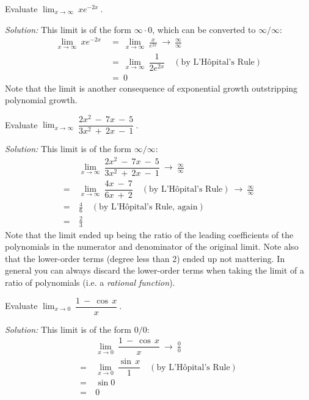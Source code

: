 \begin{exmp}\label{exmp:limzeroinf}
\noindent Evaluate $\displaystyle\lim_{x \to \infty}~x e^{-2x}~$.\vspace{1mm}
\par\noindent\emph{Solution:} This limit is of the form $\infty \cdot 0$, which
can be converted to $\infty/\infty$:
\begin{align*}
\lim_{x \to \infty}~x e^{-2x} ~&=~ \lim_{x \to \infty}~\frac{x}{e^{2x}} ~\to~ \frac{\infty}{\infty}\\
&=~ \lim_{x \to \infty}~\dfrac{1}{2e^{2x}} \quad(\text{by L'H\^{o}pital's Rule})\\
&=~ 0
\end{align*}
Note that the limit is another consequence of exponential growth outstripping
polynomial growth.
\end{exmp}
\begin{exmp}\label{exmp:limratpoly}
\noindent Evaluate $\displaystyle\lim_{x \to \infty}~\dfrac{2x^2 ~-~ 7x ~-~ 5}{3x^2 ~+~ 2x ~-~ 1}~$.\vspace{1mm}
\par\noindent\emph{Solution:} This limit is of the form $\infty/\infty$:
\begin{align*}
&\lim_{x \to \infty}~\dfrac{2x^2 ~-~ 7x ~-~ 5}{3x^2 ~+~ 2x ~-~ 1} ~\to~ \frac{\infty}{\infty}\\[4pt]
=~ &\lim_{x \to \infty}~\dfrac{4x ~-~ 7}{6x ~+~ 2} \quad(\text{by L'H\^{o}pital's Rule})
~\to~ \frac{\infty}{\infty} \\[6pt]
=~ &\frac{4}{6} \quad(\text{by L'H\^{o}pital's Rule, again})\\
=~ &\frac{2}{3}
\end{align*}
Note that the limit ended up being the ratio of the leading coefficients of the
polynomials in the numerator and denominator of the original limit. Note also
that the lower-order terms (degree less than 2) ended up not mattering. In
general you can always discard the lower-order terms when taking the limit of a
ratio of polynomials (i.e. a
\emph{rational function}).
\end{exmp}
\divider
\newpage
\begin{exmp}\label{exmp:lim1minuscos}
\noindent Evaluate $\displaystyle\lim_{x \to 0}~\dfrac{1 ~-~ \cos\,x}{x}~$.\vspace{1mm}
\par\noindent\emph{Solution:} This limit is of the form $0/0$:
\begin{align*}
&\lim_{x \to 0}~\dfrac{1 ~-~ \cos\,x}{x} ~\to~ \frac{0}{0}\\[4pt]
=~ &\lim_{x \to 0}~\dfrac{\sin\,x}{1} \quad(\text{by L'H\^{o}pital's Rule})\\[6pt]
=~ &\sin 0\\
=~ &0
\end{align*}
\end{exmp}
\divider
\vspace{3mm}

